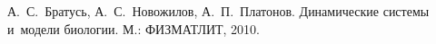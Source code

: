 \documentclass[a4paper, 11pt]{article}
\begin{document}
        

        \tableofcontents
        \clearpage
        
        
        
        

        \begin{thebibliography}{9}
                 А.~С.~Братусь, А.~С.~Новожилов, А.~П.~Платонов. Динамические системы и~модели биологии. М.: ФИЗМАТЛИТ, 2010.
        \end{thebibliography} 
\end{document}
